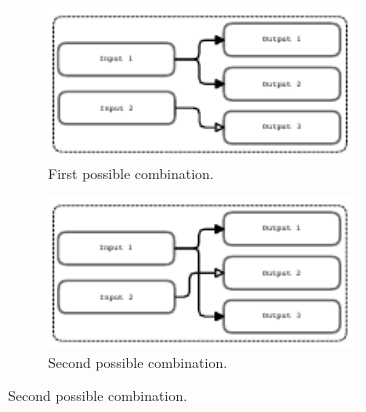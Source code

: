 \documentclass[../../thesis.tex]{subfiles}
\begin{document}
\begin{figure}
    \centering
    
    \begin{subfigure}{0.45\textwidth}
        \centering
        \includegraphics[width=0.9\textwidth]{content/unveiling/img/input-problem-1}         \caption{First possible combination.}
    \end{subfigure}\hfill
    \begin{subfigure}{0.45\textwidth}
        \centering
        \includegraphics[width=0.9\textwidth]{content/unveiling/img/input-problem-2}         \caption{Second possible combination.}
    \end{subfigure}
    

\end{figure}
\end{document}
